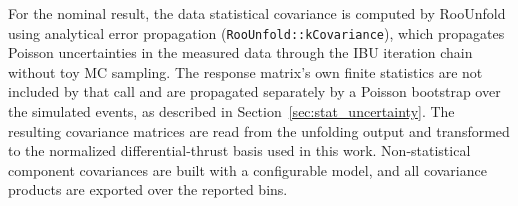 For the nominal result, the data statistical covariance is computed by RooUnfold using analytical error propagation (\texttt{RooUnfold::kCovariance}), which propagates Poisson uncertainties in the measured data through the IBU iteration chain without toy MC sampling. The response matrix's own finite statistics are not included by that call and are propagated separately by a Poisson bootstrap over the simulated events, as described in Section~\ref{sec:stat_uncertainty}. The resulting covariance matrices are read from the unfolding output and transformed to the normalized differential-thrust basis used in this work. Non-statistical component covariances are built with a configurable model, and all covariance products are exported over the reported bins.
